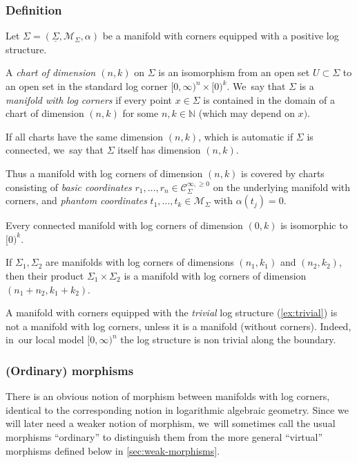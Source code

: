 \documentclass[10pt]{amsart}
\theoremstyle{definition}
\theoremstyle{remark}
\newenvironment{example}
  {\pushQED{\qed}\renewcommand{\qedsymbol}{$\lozenge$}\examplex}
  {\popQED\endexamplex}
\newenvironment{remark}
  {\pushQED{\qed}\renewcommand{\qedsymbol}{$\lozenge$}\remarkx}
  {\popQED\endremarkx}
\let\defn\emph
\newcommand{\NN}{\mathbb{N}}
\newcommand{\model}[2]{\halfspc{#1}\times[0)^{#2}}
\newcommand{\halfspc}[1]{[0,\infty)^{#1}}
\renewcommand{\ge}{\geqslant}
\newcommand{\cM}{\mathscr{M}}
\newcommand{\Cinfge}[1]{\mathscr{C}^{\infty, \ge 0}_{#1}}
\newcommand{\Sig}{\Sigma}
\newcommand{\uSig}{\underline{\Sigma}}
\begin{document}
\subsubsection{Definition} Let $\Sig=(\uSig,\cM_\Sig,\alpha)$ be a manifold with corners equipped with a positive log structure.
\begin{definition}\label{def:chart}
A \defn{chart of dimension $(n,k)$} on $\Sig$ is an isomorphism from an open set $U \subset \Sig$ to an open set in the standard log corner $\model{n}{k}$. We~say that $\Sig$ is a \defn{manifold with log corners} if every point $x \in \Sig$ is contained in the domain of a chart of dimension $(n,k)$ for some $n,k\in\NN$ (which may depend on $x)$.
\end{definition}
If all charts have the same dimension $(n,k)$, which is automatic if $\Sig$ is connected, we~say that $\Sig$ itself has dimension $(n,k)$.

Thus a manifold with log corners of dimension $(n,k)$ is covered by charts consisting of \defn{basic coordinates} $r_1,\ldots,r_n \in \Cinfge{\Sig}$ on the underlying manifold with corners, and \defn{phantom coordinates} $t_1,\ldots,t_k \in \cM_{\Sig}$ with $\alpha(t_j) =0$.

\begin{example}
Every connected manifold with log corners of dimension $(0,k)$ is isomorphic to $[0)^k$.
\end{example}

\begin{example}
If $\Sig_1,\Sig_2$ are manifolds with log corners of dimensions $(n_1,k_1)$ and $(n_2,k_2)$, then their product $\Sig_1\times\Sig_2$ is a manifold with log corners of dimension $(n_1+n_2,k_1+k_2)$.
\end{example}

\begin{remark}
A manifold with corners equipped with the \emph{trivial} log structure (\autoref{ex:trivial}) is not a manifold with log corners, unless it is a manifold (\ie without corners). Indeed, in~our local model $\halfspc{n}$ the log structure is non trivial along the boundary.
\end{remark}

\subsubsection{(Ordinary) morphisms}

There is an obvious notion of morphism between manifolds with log corners, identical to the corresponding notion in logarithmic algebraic geometry. Since we will later need a weaker notion of morphism, we~will sometimes call the usual morphisms ``ordinary'' to distinguish them from the more general ``virtual'' morphisms defined below in \autoref{sec:weak-morphisms}.
\end{document}
